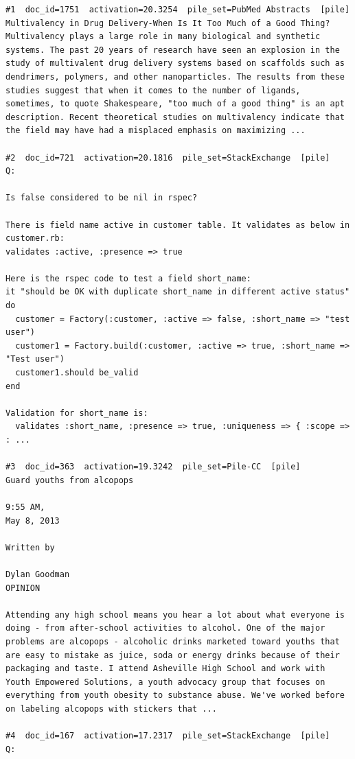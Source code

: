 \begin{verbatim}
#1  doc_id=1751  activation=20.3254  pile_set=PubMed Abstracts  [pile]
Multivalency in Drug Delivery-When Is It Too Much of a Good Thing?
Multivalency plays a large role in many biological and synthetic systems. The past 20 years of research have seen an explosion in the study of multivalent drug delivery systems based on scaffolds such as dendrimers, polymers, and other nanoparticles. The results from these studies suggest that when it comes to the number of ligands, sometimes, to quote Shakespeare, "too much of a good thing" is an apt description. Recent theoretical studies on multivalency indicate that the field may have had a misplaced emphasis on maximizing ...

#2  doc_id=721  activation=20.1816  pile_set=StackExchange  [pile]
Q:

Is false considered to be nil in rspec?

There is field name active in customer table. It validates as below in customer.rb:
validates :active, :presence => true

Here is the rspec code to test a field short_name:
it "should be OK with duplicate short_name in different active status" do
  customer = Factory(:customer, :active => false, :short_name => "test user")
  customer1 = Factory.build(:customer, :active => true, :short_name => "Test user")
  customer1.should be_valid           
end

Validation for short_name is:
  validates :short_name, :presence => true, :uniqueness => { :scope => : ...

#3  doc_id=363  activation=19.3242  pile_set=Pile-CC  [pile]
Guard youths from alcopops

9:55 AM,
May 8, 2013

Written by

Dylan Goodman
OPINION

Attending any high school means you hear a lot about what everyone is doing - from after-school activities to alcohol. One of the major problems are alcopops - alcoholic drinks marketed toward youths that are easy to mistake as juice, soda or energy drinks because of their packaging and taste. I attend Asheville High School and work with Youth Empowered Solutions, a youth advocacy group that focuses on everything from youth obesity to substance abuse. We've worked before on labeling alcopops with stickers that ...

#4  doc_id=167  activation=17.2317  pile_set=StackExchange  [pile]
Q:


\end{verbatim}
